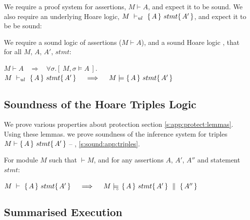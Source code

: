 We require a  proof system for assertions, $M\vdash A$, and expect it to be sound.
We also require
an   underlying Hoare logic, $M\ \vdash_{ul}\   \{\, A \, \}\ stmt \{\, A' \, \}$, and expect it to be be  sound:
\begin{axiom}
\label{lemma:axiom:enc:assert:ul}
\label{ax:ul:sound}
We require a sound logic of assertions ($M \vdash A$), and a sound Hoare logic , \ie that for all $M$, $A$, $A'$, $stmt$:
\begin{center}
$M \vdash A   \ \ \ \  \Longrightarrow  \ \ \ \  \forall \sigma.[\ M, \sigma \models A\ ]$.\\
%
%
{$M\ \vdash_{ul}\   \{\, A \, \}\ stmt \{\, A' \, \}  \ \ \ \  \Longrightarrow  \ \ \ \ M \models   \{\, A \, \}\ stmt \{\, A' \, \}$ }
 \end{center}
\end{axiom}



\subsection{Soundness of the Hoare Triples Logic}

\label{sect:prove:triples:sound}
We prove various properties about protection
\cf section \ref{s:app:protect:lemmas}.
Using these lemmas. we prove soundness of the inference system for triples $M \vdash   \{\, A \, \}\ stmt \{\, A' \, \} $ -- \cf \A, \ref{s:sound:app:triples}.

 

\begin{Theorem}
\label{l:triples:sound}
For module  $M$ %
such that  $\vdash M$, and for any assertions $A$,  $A'$, $A''$ and statement  $stmt$:
\begin{center}
$M\ \vdash\  \triple A {stmt} {A'}  \ \ \ \  \Longrightarrow  \ \ \ \ \satisfiesD {M} {\quadruple {A} {stmt} {A'} {A''}}$
\end{center}
\end{Theorem}
 

\subsection{Summarised Execution}

